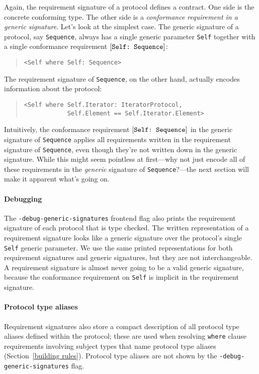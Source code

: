 \documentclass[../generics]{subfiles}
\begin{document}
Again, the requirement signature of a protocol defines a contract. One side is the concrete conforming type. The other side is a \emph{conformance requirement in a generic signature}. Let's look at the simplest case. The generic signature of a protocol, say \texttt{Sequence}, always has a single generic parameter \texttt{Self} together with a single conformance requirement $[\texttt{Self:~Sequence}]$:
\begin{quote}
\begin{verbatim}
<Self where Self: Sequence>
\end{verbatim}
\end{quote}
The requirement signature of \texttt{Sequence}, on the other hand, actually encodes information about the protocol:
\begin{quote}
\begin{verbatim}
<Self where Self.Iterator: IteratorProtocol,
            Self.Element == Self.Iterator.Element>
\end{verbatim}
\end{quote}
Intuitively, the conformance requirement $[\texttt{Self:~Sequence}]$ in the generic signature of \texttt{Sequence} applies all requirements written in the requirement signature of \texttt{Sequence}, even though they're not written down in the generic signature. While this might seem pointless at first---why not just encode all of these requirements in the \emph{generic} signature of \texttt{Sequence}?---the next section will make it apparent what's going on.

\paragraph{Debugging}
The \texttt{-debug-generic-signatures} frontend flag also prints the requirement signature of each protocol that is type checked. The written representation of a requirement signature looks like a generic signature over the protocol's single \texttt{Self} generic parameter. We use the same printed representations for both requirement signatures and generic signatures, but they are not interchangeable. A requirement signature is almost never going to be a valid generic signature, because the conformance requirement on \texttt{Self} is implicit in the requirement signature.

\paragraph{Protocol type aliases}
Requirement signatures also store a compact description of all protocol type aliases defined within the protocol; these are used when resolving \texttt{where} clause requirements involving subject types that name protocol type aliases (Section~\ref{building rules}). Protocol type aliases are not shown by the \texttt{-debug-generic-signatures} flag.
\end{document}
